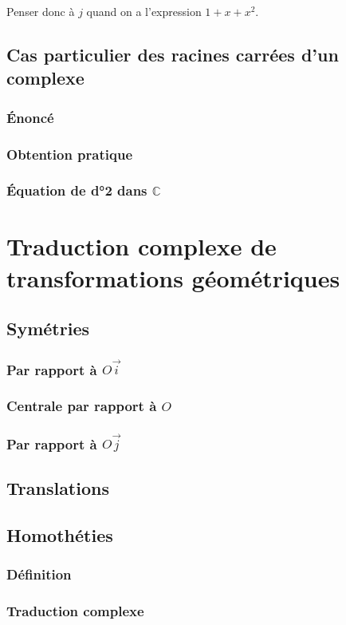 \documentclass[12pt,a4paper,french]{book}
\begin{document}
			Penser donc à $j$ quand on a l'expression $1+x+x^2$.
		\subsection{Cas particulier des racines carrées d'un complexe}
			\subsubsection{Énoncé}
			\subsubsection{Obtention pratique}
			\subsubsection{Équation de d°2 dans $\mathbb{C}$}
	\section{Traduction complexe de transformations géométriques}
		\subsection{Symétries}
			\subsubsection{Par rapport à $O\overrightarrow{i}$}
			\subsubsection{Centrale par rapport à $O$}
			\subsubsection{Par rapport à $O\overrightarrow{j}$}
		\subsection{Translations}
		\subsection{Homothéties}
			\subsubsection{Définition}
			\subsubsection{Traduction complexe}
\end{document}
